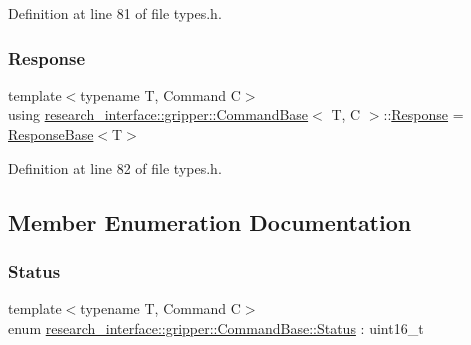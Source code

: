 Definition at line 81 of file types.\+h.

\mbox{\label{structresearch__interface_1_1gripper_1_1CommandBase_a661eac13988213b2071372ddafc09a26}} 
\subsubsection{\texorpdfstring{Response}{Response}}
{\footnotesize\ttfamily template$<$typename T, Command C$>$ \\
using \hyperlink{structresearch__interface_1_1gripper_1_1CommandBase}{research\+\_\+interface\+::gripper\+::\+Command\+Base}$<$ T, C $>$\+::\hyperlink{structresearch__interface_1_1gripper_1_1CommandBase_a661eac13988213b2071372ddafc09a26}{Response} =  \hyperlink{structresearch__interface_1_1gripper_1_1ResponseBase}{Response\+Base}$<$T$>$}



Definition at line 82 of file types.\+h.



\subsection{Member Enumeration Documentation}
\mbox{\label{structresearch__interface_1_1gripper_1_1CommandBase_a1f3949079407002d1c0587723ab3af9a}} 
\subsubsection{\texorpdfstring{Status}{Status}}
{\footnotesize\ttfamily template$<$typename T, Command C$>$ \\
enum \hyperlink{structresearch__interface_1_1gripper_1_1CommandBase_a1f3949079407002d1c0587723ab3af9a}{research\+\_\+interface\+::gripper\+::\+Command\+Base\+::\+Status} \+: uint16\+\_\+t\hspace{0.3cm}{\ttfamily [strong]}}


